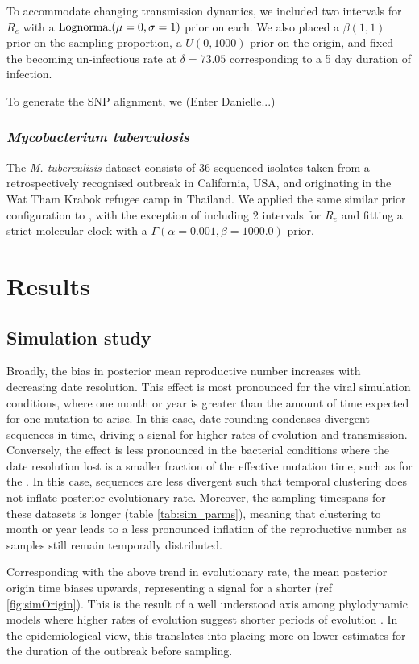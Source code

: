 \documentclass{article}
\begin{document}
\begin{spacing}{1.5}
To accommodate changing transmission dynamics, we included two intervals for $R_e$ with a $\textnormal{Lognormal}(\mu=0,\sigma=1)$ prior on each. We also placed a $\beta(1,1)$ prior on the sampling proportion, a $U(0,1000)$ prior on the origin, and fixed the becoming un-infectious rate at $\delta=73.05$ corresponding to a 5 day duration of infection.

To generate the SNP alignment, we (Enter Danielle...)

\subsubsection*{\textit{Mycobacterium tuberculosis}}
The \textit{M. tuberculisis} dataset consists of 36 sequenced isolates taken from a retrospectively recognised outbreak in California, USA, and originating in the Wat Tham Krabok refugee camp in Thailand. We applied the same similar prior configuration to \citet{kuhnert_tuberculosis_2018}, with the exception of including 2 intervals for $R_e$ and fitting a strict molecular clock with a $\Gamma(\alpha=0.001,\beta=1000.0)$ prior.


\section*{Results}
\subsection*{Simulation study}
Broadly, the bias in posterior mean reproductive number increases with decreasing date resolution. This effect is most pronounced for the viral simulation conditions, where one month or year is greater than the amount of time expected for one mutation to arise. In this case, date rounding condenses divergent sequences in time, driving a signal for higher rates of evolution and transmission. Conversely, the effect is less pronounced in the bacterial conditions where the date resolution lost is a smaller fraction of the effective mutation time, such as for the . In this case, sequences are less divergent such that temporal clustering does not inflate posterior evolutionary rate. Moreover, the sampling timespans for these datasets is longer (table \ref{tab:sim_parms}), meaning that clustering to month or year leads to a less pronounced inflation of the reproductive number as samples still remain temporally distributed.

Corresponding with the above trend in evolutionary rate, the mean posterior origin time biases upwards, representing a signal for a shorter (ref \ref{fig:simOrigin}). This is the result of a well understood axis among phylodynamic models where higher rates of evolution suggest shorter periods of evolution \citep{featherstone_decoding_2023}. In the epidemiological view, this translates into placing more on lower estimates for the duration of the outbreak before sampling.


\end{spacing}
\end{document}
